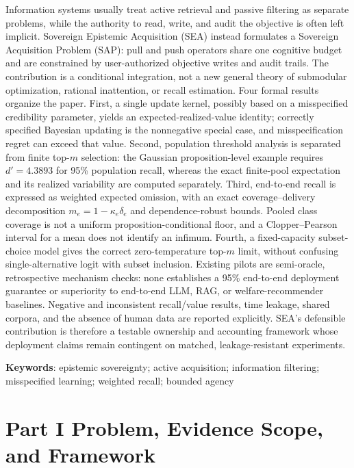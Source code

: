 \documentclass[
  11pt]{article}
\begin{document}
Information systems usually treat active retrieval and passive filtering
as separate problems, while the authority to read, write, and audit the
objective is often left implicit. Sovereign Epistemic Acquisition (SEA)
instead formulates a Sovereign Acquisition Problem (SAP): pull and push
operators share one cognitive budget and are constrained by
user-authorized objective writes and audit trails. The contribution is a
conditional integration, not a new general theory of submodular
optimization, rational inattention, or recall estimation. Four formal
results organize the paper. First, a single update kernel, possibly
based on a misspecified credibility parameter, yields an
expected-realized-value identity; correctly specified Bayesian updating
is the nonnegative special case, and misspecification regret can exceed
that value. Second, population threshold analysis is separated from
finite top-\(m\) selection: the Gaussian proposition-level example
requires \(d'=4.3893\) for 95\% population recall, whereas the exact
finite-pool expectation and its realized variability are computed
separately. Third, end-to-end recall is expressed as weighted expected
omission, with an exact coverage--delivery decomposition
\(m_e=1-\kappa_e\delta_e\) and dependence-robust bounds. Pooled class
coverage is not a uniform proposition-conditional floor, and a
Clopper--Pearson interval for a mean does not identify an infimum.
Fourth, a fixed-capacity subset-choice model gives the correct
zero-temperature top-\(m\) limit, without confusing single-alternative
logit with subset inclusion. Existing pilots are semi-oracle,
retrospective mechanism checks: none establishes a 95\% end-to-end
deployment guarantee or superiority to end-to-end LLM, RAG, or
welfare-recommender baselines. Negative and inconsistent recall/value
results, time leakage, shared corpora, and the absence of human data are
reported explicitly. SEA's defensible contribution is therefore a
testable ownership and accounting framework whose deployment claims
remain contingent on matched, leakage-resistant experiments.

\textbf{Keywords}: epistemic sovereignty; active acquisition;
information filtering; misspecified learning; weighted recall; bounded
agency

\newpage
\tableofcontents
\newpage

\section{Part I Problem, Evidence Scope, and
Framework}\label{part-i-problem-evidence-scope-and-framework}
\end{document}
